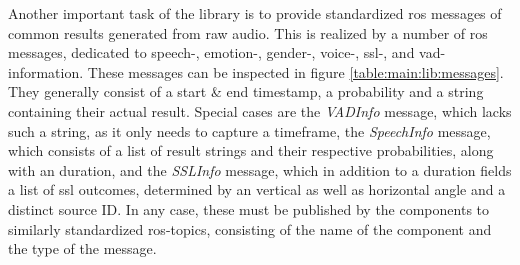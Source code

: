 Another important task of the library is to provide standardized \gls{ros} messages of common results generated from raw audio.
This is realized by a number of \gls{ros} messages, dedicated to speech-, emotion-, gender-, voice-, \gls{ssl}-, and \gls{vad}- information.
These messages can be inspected in figure \ref{table:main:lib:messages}.
They generally consist of a start \& end timestamp, a probability and a string containing their actual result.
Special cases are the \textit{VADInfo} message, which lacks such a string, as it only needs to capture a timeframe, 
the \textit{SpeechInfo} message, which consists of a list of result strings and their respective probabilities, along with an duration, 
and the \textit{SSLInfo} message, which in addition to a duration fields a list of \gls{ssl} outcomes, determined by an vertical as well as horizontal angle and a distinct source ID.
In any case, these must be published by the components to similarly standardized \gls{ros}-topics, consisting of the name of the component and the type of the message.

